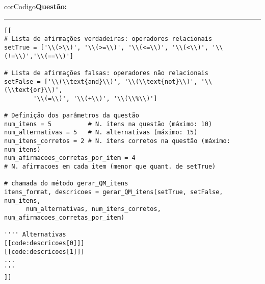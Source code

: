 \begin{listing}[!ht]
    \begin{myboxCode}{corCodigo}{\textbf{Questão: }}\vspace{3mm}
    \hrule
    \begin{verbatim}
[[
# Lista de afirmações verdadeiras: operadores relacionais
setTrue = ['\\(>\\)', '\\(>=\\)', '\\(<=\\)', '\\(<\\)', '\\(!=\\)','\\(==\\)']

# Lista de afirmações falsas: operadores não relacionais
setFalse = ['\\(\\text{and}\\)', '\\(\\text{not}\\)', '\\(\\text{or}\\)', 
        '\\(=\\)', '\\(+\\)', '\\(\\%\\)']

# Definição dos parâmetros da questão
num_itens = 5          # N. itens na questão (máximo: 10)
num_alternativas = 5   # N. alternativas (máximo: 15)
num_itens_corretos = 2 # N. itens corretos na questão (máximo: num_itens)
num_afirmacoes_corretas_por_item = 4  
# N. afirmacoes em cada item (menor que quant. de setTrue)

# chamada do método gerar_QM_itens
itens_format, descricoes = gerar_QM_itens(setTrue, setFalse, num_itens, 
      num_alternativas, num_itens_corretos, num_afirmacoes_corretas_por_item)

'''' Alternativas
[[code:descricoes[0]]]
[[code:descricoes[1]]]
...
'''
]]
\end{verbatim}
\end{myboxCode}
\caption{Exemplo de QM paramétrica de operadores relacionais -- Parte 2: Bloco de código em Python com as declarações e a chamada do método \texttt{gerar\_QM\_itens}.}
\label{lst:questaoQM_Extra1_parte2}
\end{listing}

